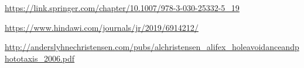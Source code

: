 \begin{thebibliography}{99}

\url{https://link.springer.com/chapter/10.1007/978-3-030-25332-5_19}

\url{https://www.hindawi.com/journals/jr/2019/6914212/}

\url{http://anderslyhnechristensen.com/pubs/alchristensen_alifex_holeavoidanceandphototaxis_2006.pdf}

\end{thebibliography}




